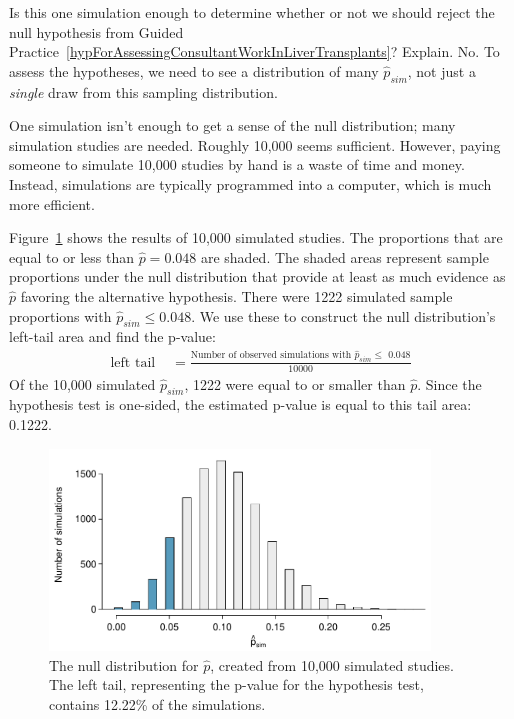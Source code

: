 \begin{example}{Is this one simulation enough to determine whether or not we should reject the null hypothesis from Guided Practice~\ref{hypForAssessingConsultantWorkInLiverTransplants}? Explain.}
No. To assess the hypotheses, we need to see a distribution of many $\hat{p}_{sim}$, not just a \emph{single} draw from this sampling distribution.
\end{example}

One simulation isn't enough to get a sense of the null distribution; many simulation studies are needed. Roughly 10,000 seems sufficient. However, paying someone to simulate 10,000 studies by hand is a waste of time and money. Instead, simulations are typically programmed into a computer, which is much more efficient.

Figure~\ref{nullDistForPHatIfLiverTransplantConsultantIsNotHelpful} shows the results of 10,000 simulated studies. The proportions that are equal to or less than $\hat{p}=0.048$ are shaded. The shaded areas represent sample proportions under the null distribution that provide at least as much evidence as $\hat{p}$ favoring the alternative hypothesis. There were 1222 simulated sample proportions with $\hat{p}_{sim} \leq 0.048$. We use these to construct the null distribution's left-tail area and find the p-value:
\begin{align}
\text{left tail }\label{estOfPValueBasedOnSimulatedNullForSingleProportion}
	&= \frac{\text{Number of observed simulations with }\hat{p}_{sim}\leq\text{ 0.048}}{10000}
\end{align}
Of the 10,000 simulated $\hat{p}_{sim}$, 1222 were equal to or smaller than $\hat{p}$. Since the hypothesis test is one-sided, the estimated p-value is equal to this tail area: 0.1222.
\begin{figure}
\centering
\includegraphics[width=0.9\textwidth]{ch_inference_for_props/figures/nullDistForPHatIfLiverTransplantConsultantIsNotHelpful/nullDistForPHatIfLiverTransplantConsultantIsNotHelpful}
\caption{The null distribution for $\hat{p}$, created from 10,000 simulated studies. The left tail, representing the p-value for the hypothesis test, contains 12.22\% of the simulations.}
\label{nullDistForPHatIfLiverTransplantConsultantIsNotHelpful}
\end{figure}

